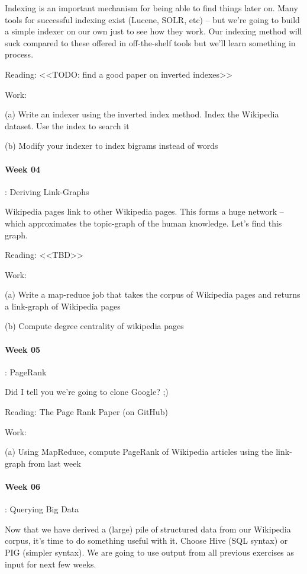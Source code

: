 \documentclass[12pt]{article}
\begin{document}
Indexing is an important mechanism for being able to find things later on. Many tools for successful indexing exist (Lucene, SOLR, etc) -- but we're going to build a simple indexer on our own just to see how they work. Our indexing method will suck compared to these offered in off-the-shelf tools but we'll learn something in process. 

Reading: <<TODO: find a good paper on inverted indexes>>

Work: 

(a) Write an indexer using the inverted index method. Index the Wikipedia dataset. Use the index to search it

(b) Modify your indexer to index bigrams instead of words

\paragraph{Week 04}: Deriving Link-Graphs

Wikipedia pages link to other Wikipedia pages. This forms a huge network -- which approximates the topic-graph of the human knowledge. Let's find this graph. 

Reading: <<TBD>>

Work:

(a) Write a map-reduce job that takes the corpus of Wikipedia pages and returns a link-graph of Wikipedia pages

(b) Compute degree centrality of wikipedia pages

\paragraph{Week 05}: PageRank

Did I tell you we're going to clone Google? ;)

Reading: The Page Rank Paper (on GitHub)

Work:

(a) Using MapReduce, compute PageRank of Wikipedia articles using the link-graph from last week

\paragraph{Week 06}: Querying Big Data

Now that we have derived a (large) pile of structured data from our Wikipedia corpus, it's time to do something useful with it. Choose Hive (SQL syntax) or PIG (simpler syntax). 
We are going to use output from all previous exercises as input for next few weeks.
\end{document}
